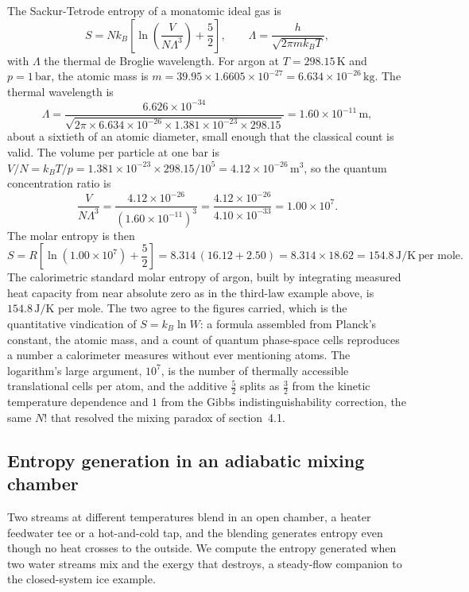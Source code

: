 The Sackur-Tetrode entropy of a monatomic ideal gas is
\[
S = N k_B\left[\ln\!\left(\frac{V}{N\Lambda^3}\right) + \frac{5}{2}\right],
\qquad
\Lambda = \frac{h}{\sqrt{2\pi m k_B T}},
\]
with $\Lambda$ the thermal de Broglie wavelength. For argon at $T = 298.15\,
\si{\kelvin}$ and $p = 1\,\text{bar}$, the atomic mass is $m = 39.95\times
1.6605\times10^{-27} = 6.634\times10^{-26}\,\text{kg}$. The thermal wavelength is
\[
\Lambda = \frac{6.626\times10^{-34}}
{\sqrt{2\pi\times 6.634\times10^{-26}\times 1.381\times10^{-23}\times 298.15}}
= 1.60\times10^{-11}\,\text{m},
\]
about a sixtieth of an atomic diameter, small enough that the classical count is
valid. The volume per particle at one bar is $V/N = k_B T/p = 1.381\times10^{-23}
\times 298.15/10^{5} = 4.12\times10^{-26}\,\text{m}^3$, so the quantum
concentration ratio is
\[
\frac{V}{N\Lambda^3} = \frac{4.12\times10^{-26}}{(1.60\times10^{-11})^3}
= \frac{4.12\times10^{-26}}{4.10\times10^{-33}} = 1.00\times10^{7}.
\]
The molar entropy is then
\[
S = R\left[\ln(1.00\times10^{7}) + \frac52\right]
= 8.314\,(16.12 + 2.50)
= 8.314\times 18.62 = 154.8\,\si{\joule\per\kelvin}\ \text{per mole}.
\]
The calorimetric standard molar entropy of argon, built by integrating measured
heat capacity from near absolute zero as in the third-law example above, is
$154.8\,\si{\joule\per\kelvin}$ per mole. The two agree to the figures carried,
which is the quantitative vindication of $S = k_B\ln W$: a formula assembled from
Planck's constant, the atomic mass, and a count of quantum phase-space cells
reproduces a number a calorimeter measures without ever mentioning atoms. The
logarithm's large argument, $10^7$, is the number of thermally accessible
translational cells per atom, and the additive $\tfrac52$ splits as $\tfrac32$
from the kinetic temperature dependence and $1$ from the Gibbs
indistinguishability correction, the same $N!$ that resolved the mixing paradox
of section~4.1.

\subsection{Entropy generation in an adiabatic mixing chamber}

Two streams at different temperatures blend in an open chamber, a heater feedwater
tee or a hot-and-cold tap, and the blending generates entropy even though no heat
crosses to the outside. We compute the entropy generated when two water streams
mix and the exergy that destroys, a steady-flow companion to the closed-system ice
example.

